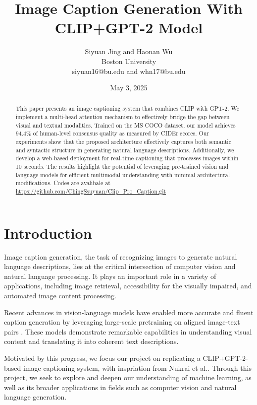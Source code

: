 \documentclass[11pt]{article}
\begin{document}
\title{Image Caption Generation With CLIP+GPT-2 Model}
\author{Siyuan Jing and Haonan Wu\\ Boston University \\ siyuan16@bu.edu and whn17@bu.edu}
\date{May 3, 2025}
\maketitle

\begin{abstract}
        This paper presents an image captioning system that combines CLIP with GPT-2.
        We implement a multi-head attention mechanism to effectively bridge the gap between visual and textual modalities. 
        Trained on the MS COCO dataset, 
        our model achieves 94.4\% of human-level consensus quality as 
        measured by CIDEr scores. Our experiments show that the proposed architecture effectively 
        captures both semantic  and syntactic structure in generating natural language descriptions. Additionally, 
        we develop a web-based deployment for real-time captioning that processes images within 10 seconds.
        The results highlight the potential of leveraging pre-trained vision and language 
        models for efficient multimodal understanding with minimal architectural modifications. Codes are avalibale at \url{https://github.com/ChingSsuyuan/Clip_Pro_Caption.git}
\end{abstract}

\section{Introduction}
Image caption generation, the task of recognizing images to generate natural language descriptions, lies at the critical intersection of 
computer vision and natural language processing. 
It plays an important role in a variety of applications, including image retrieval, accessibility for the visually impaired, and automated image content processing.

Recent advances in vision-language models have enabled more accurate and 
fluent caption generation by leveraging large-scale pretraining on aligned image-text pairs 
. These models demonstrate remarkable capabilities in understanding visual content and 
translating it into coherent text descriptions.

Motivated by this progress, we focus our project on replicating a CLIP+GPT-2-based image captioning system, with inspriation from Nukrai et al.\cite{Nukrai2022}. Through this project, we seek to explore and deepen our understanding of 
machine learning, as well as its broader applications in fields such as computer vision and natural language generation.
\end{document}
